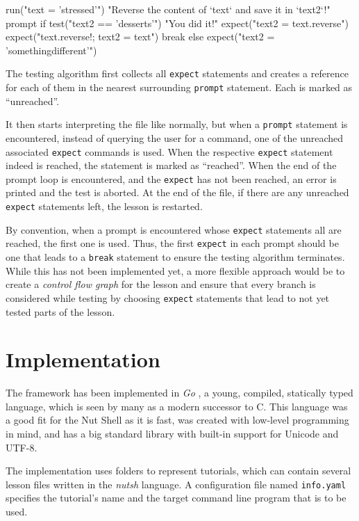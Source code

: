 \documentclass[paper=a4,twoside,abstract=on,cleardoublepage=empty,numbers=noenddot,toc=bib,toc=listof,12pt,appendixprefix=true]{scrreprt}
\begin{document}
\begin{nutsh}
run("text = 'stressed'")
"Reverse the content of `text` and save it in `text2`!"
prompt {
    if test("text2 == 'desserts'") {
        "You did it!"
        expect("text2 = text.reverse")
        expect("text.reverse!; text2 = text")
        break
    } else {
        expect("text2 = 'somethingdifferent'")
    }
}
\end{nutsh}

The testing algorithm first collects all \texttt{expect} statements and creates a reference for each of them in the nearest surrounding \texttt{prompt} statement. Each is marked as “unreached”.

It then starts interpreting the file like normally, but when a \texttt{prompt} statement is encountered, instead of querying the user for a command, one of the unreached associated \texttt{expect} commands is used. When the respective \texttt{expect} statement indeed is reached, the statement is marked as “reached”. When the end of the prompt loop is encountered, and the \texttt{expect} has not been reached, an error is printed and the test is aborted. At the end of the file, if there are any unreached \texttt{expect} statements left, the lesson is restarted.

By convention, when a prompt is encountered whose \texttt{expect} statements all are reached, the first one is used. Thus, the first \texttt{expect} in each prompt should be one that leads to a \texttt{break} statement to ensure the testing algorithm terminates. While this has not been implemented yet, a more flexible approach would be to create a \emph{control flow graph} for the lesson and ensure that every branch is considered while testing by choosing \texttt{expect} statements that lead to not yet tested parts of the lesson.

\chapter{Implementation}
\label{sec:implementation}

The framework has been implemented in \emph{Go} \cite{google13}, a young, compiled, statically typed language, which is seen by many as a modern successor to C. This language was a good fit for the Nut Shell as it is fast, was created with low-level programming in mind, and has a big standard library with built-in support for Unicode and UTF-8.

The implementation uses folders to represent tutorials, which can contain several lesson files written in the \emph{nutsh} language. A configuration file named \texttt{info.yaml} specifies the tutorial's name and the target command line program that is to be used.
\end{document}
